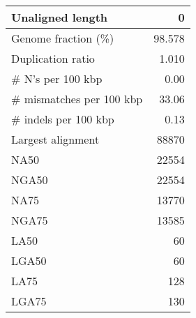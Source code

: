 \documentclass[12pt,a4paper]{article}
\begin{document}
\begin{table}[ht]
\begin{center}
\begin{tabular}{|l*{1}{|r}|}
Unaligned length & 0 \\ \hline
Genome fraction (\%) & 98.578 \\ \hline
Duplication ratio & 1.010 \\ \hline
\# N's per 100 kbp & 0.00 \\ \hline
\# mismatches per 100 kbp & 33.06 \\ \hline
\# indels per 100 kbp & 0.13 \\ \hline
Largest alignment & 88870 \\ \hline
NA50 & 22554 \\ \hline
NGA50 & 22554 \\ \hline
NA75 & 13770 \\ \hline
NGA75 & 13585 \\ \hline
LA50 & 60 \\ \hline
LGA50 & 60 \\ \hline
LA75 & 128 \\ \hline
LGA75 & 130 \\ \hline
\end{tabular}
\end{center}
\end{table}
\end{document}
